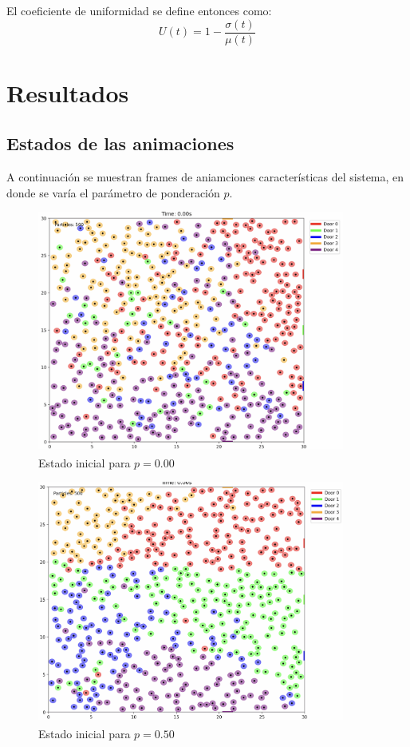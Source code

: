\documentclass[12pt]{article}
\begin{document}
El coeficiente de uniformidad se define entonces como:
\[
U(t) = 1 - \frac{\sigma(t)}{\mu(t)}
\]


\section{Resultados}

\subsection{Estados de las animaciones}

A continuación se muestran frames de aniamciones características del sistema, en donde se varía el parámetro de ponderación $p$.
\begin{figure}[H]
\centering
\includegraphics[width=0.9\textwidth]{img/frames/t_20_&_p_0.00.jpg}
\caption{Estado inicial para $p=0.00$}
\label{fig:evac_time_ct}
\end{figure}

\begin{figure}[H]
\centering
\includegraphics[width=0.9\textwidth]{img/frames/t_20_&_p_0.50.jpg}
\caption{Estado inicial para $p=0.50$}
\label{fig:evac_time_ct}
\end{figure}
\end{document}
